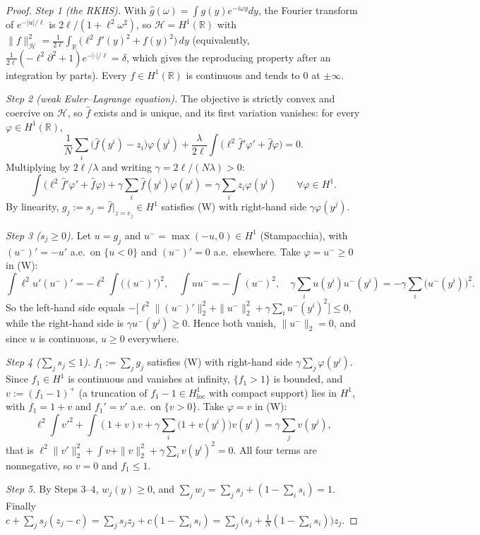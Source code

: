 \begin{proof}
\emph{Step 1 (the RKHS).} With $\hat g(\omega)=\int g(y)e^{-i\omega y}dy$, the Fourier transform of
$e^{-|u|/\ell}$ is $2\ell/(1+\ell^2\omega^2)$, so $\mathcal H=H^1(\mathbb R)$ with
$\|f\|_{\mathcal H}^2=\frac{1}{2\ell}\int_{\mathbb R}\big(\ell^2f'(y)^2+f(y)^2\big)\,dy$
(equivalently, $\frac1{2\ell}(-\ell^2\partial^2+1)e^{-|\cdot|/\ell}=\delta$, which gives the
reproducing property after an integration by parts). Every $f\in H^1(\mathbb R)$ is continuous and
tends to $0$ at $\pm\infty$.

\emph{Step 2 (weak Euler--Lagrange equation).} The objective is strictly convex and coercive on
$\mathcal H$, so $\hat f$ exists and is unique, and its first variation vanishes: for every
$\varphi\in H^1(\mathbb R)$,
\[
\frac1N\sum_i\big(\hat f(y^i)-z_i\big)\varphi(y^i)+\frac{\lambda}{2\ell}\int\big(\ell^2\hat f'\varphi'+\hat f\varphi\big)=0 .
\]
Multiplying by $2\ell/\lambda$ and writing $\gamma=2\ell/(N\lambda)>0$:
\begin{equation}
\int\big(\ell^2\hat f'\varphi'+\hat f\varphi\big)+\gamma\sum_i\hat f(y^i)\varphi(y^i)
=\gamma\sum_iz_i\varphi(y^i)\qquad\forall\varphi\in H^1. \tag{W}
\end{equation}
By linearity, $g_j:=s_j=\hat f\big|_{z=e_j}\in H^1$ satisfies (W) with right-hand side
$\gamma\varphi(y^j)$.

\emph{Step 3 ($s_j\ge0$).} Let $u=g_j$ and $u^-=\max(-u,0)\in H^1$ (Stampacchia), with
$(u^-)'=-u'$ a.e.\ on $\{u<0\}$ and $(u^-)'=0$ a.e.\ elsewhere. Take $\varphi=u^-\ge0$ in (W):
\[
\int\ell^2u'(u^-)'=-\ell^2\!\int\big((u^-)'\big)^2,\quad \int uu^-=-\int(u^-)^2,\quad
\gamma\sum_iu(y^i)u^-(y^i)=-\gamma\sum_i\big(u^-(y^i)\big)^2 .
\]
So the left-hand side equals $-\big[\ell^2\|(u^-)'\|_2^2+\|u^-\|_2^2+\gamma\sum_iu^-(y^i)^2\big]\le0$,
while the right-hand side is $\gamma u^-(y^j)\ge0$. Hence both vanish, $\|u^-\|_2=0$, and since
$u$ is continuous, $u\ge0$ everywhere.

\emph{Step 4 ($\sum_js_j\le1$).} $f_1:=\sum_jg_j$ satisfies (W) with right-hand side
$\gamma\sum_j\varphi(y^j)$. Since $f_1\in H^1$ is continuous and vanishes at infinity,
$\{f_1>1\}$ is bounded, and $v:=(f_1-1)^+$ (a truncation of $f_1-1\in H^1_{\mathrm{loc}}$ with
compact support) lies in $H^1$, with $f_1=1+v$ and $f_1'=v'$ a.e.\ on $\{v>0\}$. Take
$\varphi=v$ in (W):
\[
\ell^2\!\int v'^2+\int(1+v)v+\gamma\sum_i\big(1+v(y^i)\big)v(y^i)=\gamma\sum_jv(y^j),
\]
that is $\ell^2\|v'\|_2^2+\int v+\|v\|_2^2+\gamma\sum_iv(y^i)^2=0$. All four terms are
nonnegative, so $v=0$ and $f_1\le1$.

\emph{Step 5.} By Steps 3--4, $w_j(y)\ge0$, and $\sum_jw_j=\sum_js_j+(1-\sum_is_i)=1$. Finally
$c+\sum_js_j(z_j-c)=\sum_js_jz_j+c(1-\sum_is_i)=\sum_j\big(s_j+\tfrac1N(1-\sum_is_i)\big)z_j$.
\end{proof}

